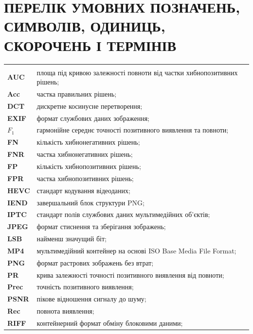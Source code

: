 \chapter*{ПЕРЕЛІК УМОВНИХ ПОЗНАЧЕНЬ, СИМВОЛІВ, ОДИНИЦЬ, СКОРОЧЕНЬ І ТЕРМІНІВ}
{}

\begingroup
\small
\setcounter{table}{-1}
\begin{longtable}{>{\bfseries}p{}p{}}
\multicolumn{2}{l}{\textbf{Скорочення та назви форматів}}\\
AUC & площа під кривою залежності повноти від частки хибнопозитивних рішень;\\
Acc & частка правильних рішень;\\
DCT & дискретне косинусне перетворення;\\
EXIF & формат службових даних зображення;\\
$F_1$ & гармонійне середнє точності позитивного виявлення та повноти;\\
FN & кількість хибнонегативних рішень;\\
FNR & частка хибнонегативних рішень;\\
FP & кількість хибнопозитивних рішень;\\
FPR & частка хибнопозитивних рішень;\\
HEVC & стандарт кодування відеоданих;\\
IEND & завершальний блок структури PNG;\\
IPTC & стандарт полів службових даних мультимедійних об’єктів;\\
JPEG & формат стиснення та зберігання зображень;\\
LSB & найменш значущий біт;\\
MP4 & мультимедійний контейнер на основі ISO Base Media File Format;\\
PNG & формат растрових зображень без втрат;\\
PR & крива залежності точності позитивного виявлення від повноти;\\
Prec & точність позитивного виявлення;\\
PSNR & пікове відношення сигналу до шуму;\\
Rec & повнота виявлення;\\
RIFF & контейнерний формат обміну блоковими даними;\\

\end{longtable}
